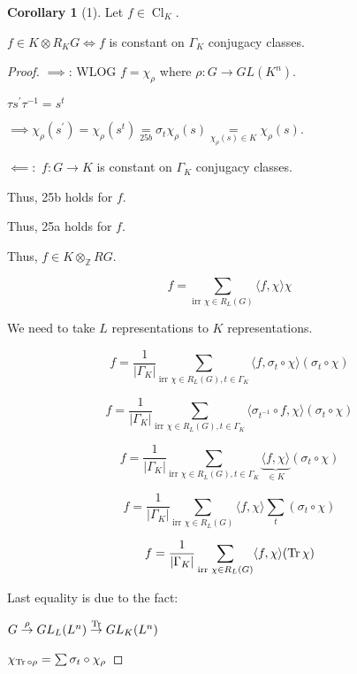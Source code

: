 \documentclass{article}
\theoremstyle{definition}
\newtheorem{corollary}[theorem]{Corollary}
\begin{document}
\begin{corollary}
    [1] Let \(f\in \operatorname{Cl}_K\).

    \(f \in K \otimes R_K G \iff f\) is constant on \(\Gamma_K\) conjugacy classes.
\end{corollary}

\begin{proof}
    \(\implies\): WLOG \(f = \chi_{\rho}\) where \(\rho: G \to GL(K^n)\).

    \(\tau s^{\prime} \tau ^{-1} = s^t\)

    \(\implies \chi_{\rho} (s^{\prime}) = \chi_{\rho} (s^t) \underset{25b}{=} \sigma_t \chi_{\rho} (s) \underset{\chi_{\rho}(s) \in K}{=} \chi_{\rho} (s)\).
    
    \(\impliedby:\) \(f: G \to K\) is constant on \(\Gamma_K\) conjugacy classes.

    Thus, 25b holds for \(f\).

    Thus, 25a holds for \(f\).

    Thus, \(f\in K \otimes_\mathbb{Z} RG\).

    \[
        f = \sum_{\text{irr } \chi \in R_L(G)} \langle f, \chi \rangle \chi
    \]

    We need to take \(L\) representations to \(K\) representations.

    \[
        f = \frac{1}{\vert \Gamma_K \vert} \sum_{\text{irr } \chi \in R_L(G), t \in \Gamma_K} \langle f, \sigma_t \circ \chi \rangle (\sigma_t \circ \chi) 
    \]

    \[
        f = \frac{1}{\vert \Gamma_K \vert} \sum_{\text{irr } \chi \in R_L(G), t \in \Gamma_K} \langle \sigma_{t ^{-1}} \circ f, \chi \rangle (\sigma_t \circ \chi) 
    \]

    \[
        f = \frac{1}{\vert \Gamma_K \vert} \sum_{\text{irr } \chi \in R_L(G), t \in \Gamma_K} \underbrace{\langle f, \chi \rangle}_{\in K} (\sigma_t \circ \chi) 
    \]

    \[
        f = \frac{1}{\vert \Gamma_K \vert} \sum_{\text{irr } \chi \in R_L(G)} \langle f, \chi \rangle \sum_{t}  (\sigma_t \circ \chi) 
    \]

    \[
        f = \frac{1}{\vert \Gamma_K \vert} \sum_{\text{irr } \chi \in R_L(G)} \langle f, \chi \rangle (\Tr \chi)
    \]

    Last equality is due to the fact:

    \(G \overset{\rho}{\to} GL_L (L^n) \overset{\Tr}{\to} GL_K(L^n)\)

    \(\chi_{\Tr \circ \rho} = \sum \sigma_t \circ \chi_{\rho}\)
\end{proof}
\end{document}
